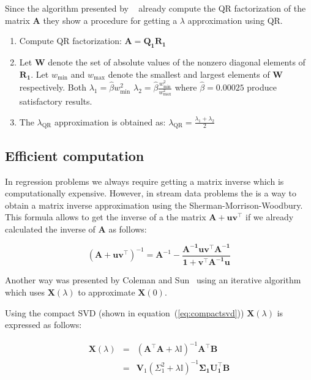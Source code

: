 Since the algorithm presented by ~\cite{coleman+sun2010} already compute the QR
factorization of the matrix $\mathbf{A}$ they show a procedure for getting
a $\lambda$ approximation using QR.

\begin{enumerate}
\item Compute QR factorization: $\mathbf{A} = \mathbf{Q_1R_1}$
\item Let $\mathbf{W}$ denote the set of absolute values of the nonzero diagonal
elements of $\mathbf{R_1}$. Let $w_{\text{min}}$ and $w_{\text{max}}$ denote the
smallest and largest elements of $\mathbf{W}$ respectively. Both 
$\lambda_1 = \hat{\beta} w_{\text{min}}^2$
$\lambda_2 = \hat{\beta} \frac{w_{\text{min}}^2}{w_{\text{max}}^2}$ where
$\hat{\beta}=0.00025$ produce satisfactory results.
\item The $\lambda_{\text{QR}}$ approximation is obtained as:
$\lambda_{\text{QR}} = \frac{\lambda_1 + \lambda_2}{2}$  
\end{enumerate}

\subsection{Efficient computation}

In regression problems we always require getting a matrix inverse which is
computationally expensive. However, in stream data problems the is a way to
obtain a matrix inverse approximation using the Sherman-Morrison-Woodbury. This
formula allows to get the inverse of a
the matrix $\mathbf{A+uv^\top}$ if we already calculated the
inverse of $\mathbf{A}$ as follows:

\begin{equation}
\label{eq:SMW}
(\mathbf{A+uv^\top})^{-1}=\mathbf{A}^{-1}-
\frac{\mathbf{A^{-1}uv^\top A^{-1}}}{\mathbf{1+v^\top A^{-1}u}}
\end{equation}


Another way was presented by Coleman and
Sun~\cite{coleman+sun2010} using an iterative algorithm which
uses $\mathbf{X}(\lambda)$ to approximate $\mathbf{X}(0)$.


Using the compact SVD (shown in equation~(\ref{eq:compactsvd}))
$\mathbf{X}(\lambda)$ is expressed as follows:


\begin{eqnarray}
\label{eq:optsolRRsvd}
\mathbf{X}(\lambda) & = & (\mathbf{A}^\top \mathbf{A}+ \lambda
\mathbb{I})^{-1}\mathbf{A}^\top \mathbf{B} \nonumber \\
& = &\mathbf{V}_1(\Sigma_1^2+\lambda \mathbb{I})^{-1}\mathbf{\Sigma_1
U_1^\top B}
\end{eqnarray}

